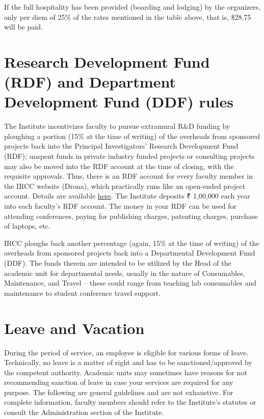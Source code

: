 \documentclass[
  10pt,
  a5paper,
  10pt,
  openany]{amsbook}
\begin{document}
If the full hospitality has been provided (boarding and lodging) by the
organizers, only per diem of 25\% of the rates mentioned in the table
above, that is, \$28.75 will be paid.

\chapter{Research Development Fund (RDF) and Department Development Fund
(DDF) rules}\label{sec:rdfddf}

The Institute incentivizes faculty to pursue extramural R\&D funding by
ploughing a portion (15\% at the time of writing) of the overheads from
sponsored projects back into the Principal Investigators' Research
Development Fund (RDF); unspent funds in private industry funded
projects or consulting projects may also be moved into the RDF account
at the time of closing, with the requisite approvals. Thus, there is an
RDF account for every faculty member in the IRCC website (Drona), which
practically runs like an open-ended project account. Details are
available \href{https://rndhelp.ircc.iitb.ac.in/faculty/rdf}{here}. The
Institute deposits ₹ 1,00,000 each year into each faculty's RDF account.
The money in your RDF can be used for attending conferences, paying for
publishing charges, patenting charges, purchase of laptops, etc.

IRCC ploughs back another percentage (again, 15\% at the time of
writing) of the overheads from sponsored projects back into a
Departmental Development Fund (DDF). The funds therein are intended to
be utilized by the Head of the academic unit for departmental needs,
usually in the nature of Consumables, Maintenance, and Travel -- these
could range from teaching lab consumables and maintenance to student
conference travel support.

\chapter{Leave and Vacation}\label{leave-and-vacation}

During the period of service, an employee is eligible for various forms
of leave. Technically, no leave is a matter of right and has to be
sanctioned/approved by the competent authority. Academic units may
sometimes have reasons for not recommending sanction of leave in case
your services are required for any purpose. The following are general
guidelines and are not exhaustive. For complete information, faculty
members should refer to the Institute's statutes or consult the
Administration section of the Institute.
\end{document}
